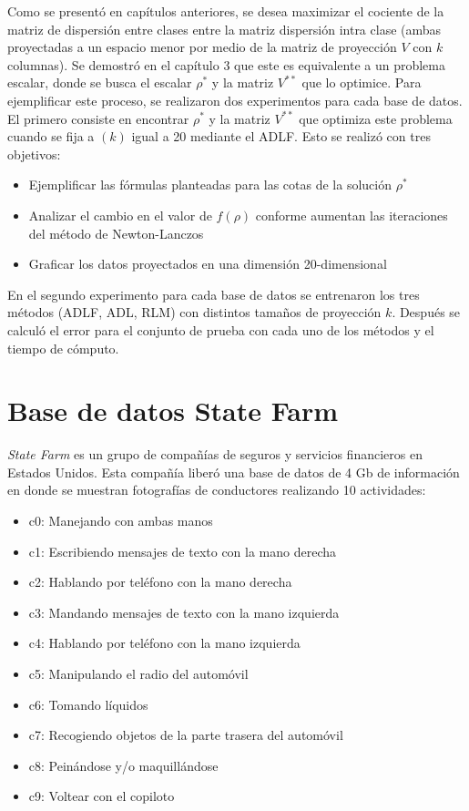 Como se presentó en capítulos anteriores, se desea maximizar el cociente de la matriz de dispersión entre clases entre la matriz dispersión intra clase (ambas proyectadas a un espacio menor por medio de la matriz de proyección $V$ con $k$ columnas). Se demostró en el capítulo 3 que este es equivalente a un problema escalar, donde se busca el escalar $\rho^*$ y la matriz $V^{**}$ que lo optimice. Para ejemplificar este proceso, se realizaron dos experimentos para cada base de datos. El primero consiste en encontrar $\rho^*$ y la matriz $V^{**}$ que optimiza este problema cuando se fija a $(k)$ igual a 20 mediante el ADLF. Esto se realizó con tres objetivos:

\begin{itemize}
\item Ejemplificar las fórmulas planteadas para las cotas de la solución $\rho^*$
\item Analizar el cambio en el valor de $f(\rho)$ conforme aumentan las iteraciones del método de Newton-Lanczos
\item Graficar los datos proyectados en una dimensión 20-dimensional
\end{itemize}

En el segundo experimento para cada base de datos se entrenaron los tres métodos (ADLF, ADL, RLM) con distintos tamaños de proyección $k$. Después se calculó el error para el conjunto de prueba con cada uno de los métodos y el tiempo de cómputo. 

\section{Base de datos State Farm}

\textit{State Farm} es un grupo de compañías de seguros y servicios financieros en Estados Unidos. Esta compañía liberó una base de datos de 4 Gb de información en donde se muestran fotografías de conductores realizando 10 actividades: 

\begin{itemize}
\item c0: Manejando con ambas manos
\item c1: Escribiendo mensajes de texto con la mano derecha
\item c2: Hablando por teléfono con la mano derecha
\item c3: Mandando mensajes de texto con la mano izquierda
\item c4: Hablando por teléfono con la mano izquierda
\item c5: Manipulando el radio del automóvil
\item c6: Tomando líquidos
\item c7: Recogiendo objetos de la parte trasera del automóvil
\item c8: Peinándose y/o maquillándose 
\item c9: Voltear con el copiloto
\end{itemize}

